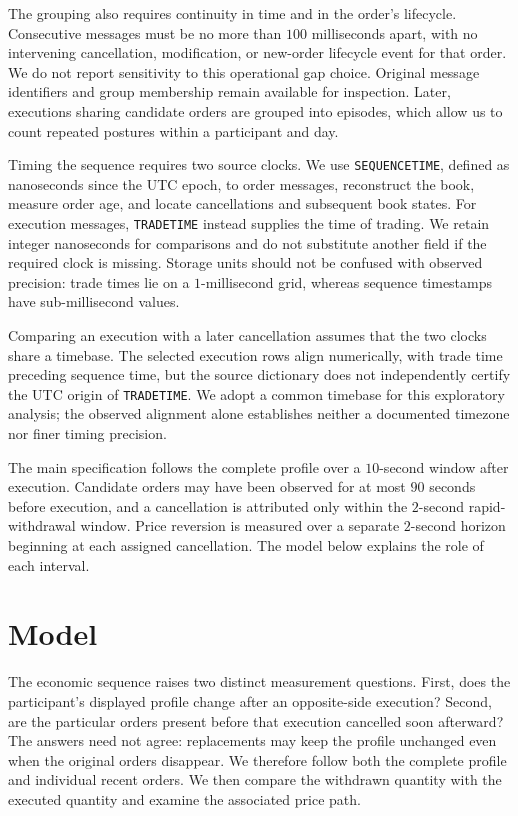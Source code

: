 \documentclass[11pt]{article}
\begin{document}
The grouping also requires continuity in time and in the order's lifecycle. Consecutive messages must be no more than $100$ milliseconds apart, with no intervening cancellation, modification, or new-order lifecycle event for that order. We do not report sensitivity to this operational gap choice. Original message identifiers and group membership remain available for inspection. Later, executions sharing candidate orders are grouped into episodes, which allow us to count repeated postures within a participant and day.

Timing the sequence requires two source clocks. We use \texttt{SEQUENCETIME}, defined as nanoseconds since the UTC epoch,
to order messages, reconstruct the book, measure order age, and locate cancellations and subsequent book states.
For execution messages, \texttt{TRADETIME} instead supplies the time of trading. We retain integer nanoseconds for
comparisons and do not substitute another field if the required clock is missing. Storage units should not be confused
with observed precision: trade times lie on a $1$-millisecond grid, whereas sequence timestamps have sub-millisecond values.

Comparing an execution with a later cancellation assumes that the two clocks share a timebase. The selected execution
rows align numerically, with trade time preceding sequence time, but the source dictionary does not independently
certify the UTC origin of \texttt{TRADETIME}. We adopt a common timebase for this exploratory analysis; the observed
alignment alone establishes neither a documented timezone nor finer timing precision.

The main specification follows the complete profile over a $10$-second window after execution. Candidate orders may
have been observed for at most $90$ seconds before execution, and a cancellation is attributed only within the
$2$-second rapid-withdrawal window. Price reversion is measured over a separate $2$-second horizon beginning at each
assigned cancellation. The model below explains the role of each interval.

\section{Model}
\label{sec:model}
The economic sequence raises two distinct measurement questions. First, does the participant's displayed profile change after an opposite-side execution? Second, are the particular orders present before that execution cancelled soon afterward? The answers need not agree: replacements may keep the profile unchanged even when the original orders disappear. We therefore follow both the complete profile and individual recent orders. We then compare the withdrawn quantity with the executed quantity and examine the associated price path.
\end{document}
